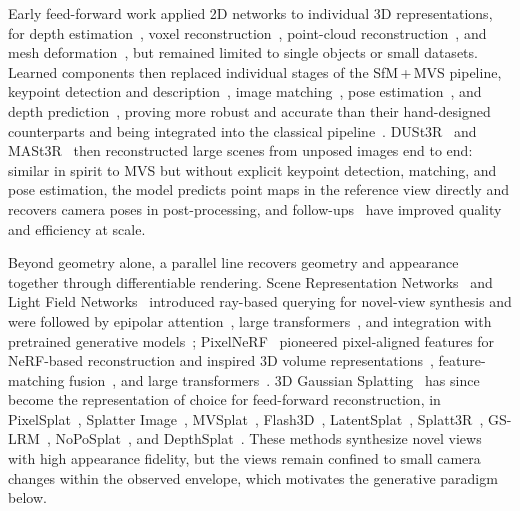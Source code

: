 Early feed-forward work applied 2D networks to individual 3D representations, for depth estimation~\cite{eigen2014depth, liu2015learning}, voxel reconstruction~\cite{choy20163d, wu20153d}, point-cloud reconstruction~\cite{fan2017point, qi2017pointnet}, and mesh deformation~\cite{wang2018pixel2mesh, gkioxari2019mesh}, but remained limited to single objects or small datasets.
Learned components then replaced individual stages of the SfM\,+\,MVS pipeline, keypoint detection and description~\cite{detone2018superpoint, dusmanu2019d2, tyszkiewicz2020disk}, image matching~\cite{sarlin2020superglue, lindenberger2023lightglue}, pose estimation~\cite{kendall2015posenet, yin2018geonet, kendall2017geometric}, and depth prediction~\cite{zhou2017unsupervised, yin2018geonet}, proving more robust and accurate than their hand-designed counterparts and being integrated into the classical pipeline~\cite{vzbontar2016stereo, yao2018mvsnet, yao2019recurrent}.
DUSt3R~\cite{wang2024dust3r} and MASt3R~\cite{mast3r} then reconstructed large scenes from unposed images end to end: similar in spirit to MVS but without explicit keypoint detection, matching, and pose estimation, the model predicts point maps in the reference view directly and recovers camera poses in post-processing, and follow-ups~\cite{tang2025mv, wang2025Cut3R, yang2025fast3r, zhang2025FLARE, wang2025vggt} have improved quality and efficiency at scale.

Beyond geometry alone, a parallel line recovers geometry and appearance together through differentiable rendering.
Scene Representation Networks~\cite{sitzmann2019scene} and Light Field Networks~\cite{sitzmann2021light} introduced ray-based querying for novel-view synthesis and were followed by epipolar attention~\cite{suhail2022light, suhail2022generalizable}, large transformers~\cite{jin2025lvsm, jiang2025rayzer}, and integration with pretrained generative models~\cite{zheng2024free3d, gao2024cat3d}; PixelNeRF~\cite{yu2021pixelnerf} pioneered pixel-aligned features for NeRF-based reconstruction and inspired 3D volume representations~\cite{chen2021mvsnerf, xu2024murf}, feature-matching fusion~\cite{chen2025explicit}, and large transformers~\cite{du2023learning, hong2023lrm}.
3D Gaussian Splatting~\cite{kerbl20233d} has since become the representation of choice for feed-forward reconstruction, in PixelSplat~\cite{charatan2024pixelsplat}, Splatter Image~\cite{szymanowicz2024splatter}, MVSplat~\cite{chen2024mvsplat}, Flash3D~\cite{szymanowicz2024flash3d}, LatentSplat~\cite{wewer2024latentsplat}, Splatt3R~\cite{smart2024splatt3r}, GS-LRM~\cite{zhang2024gs}, NoPoSplat~\cite{ye2024no}, and DepthSplat~\cite{xu2024depthsplat}.
These methods synthesize novel views with high appearance fidelity, but the views remain confined to small camera changes within the observed envelope, which motivates the generative paradigm below.


